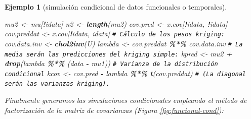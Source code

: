 \documentclass[
  spanish,
  10pt,
]{book}
\newenvironment{Shaded}{\begin{snugshade}}{\end{snugshade}}
\newcommand{\CommentTok}[1]{\textcolor[rgb]{0.56,0.35,0.01}{\textit{#1}}}
\newcommand{\FunctionTok}[1]{\textcolor[rgb]{0.13,0.29,0.53}{\textbf{#1}}}
\newcommand{\NormalTok}[1]{#1}
\newcommand{\OtherTok}[1]{\textcolor[rgb]{0.56,0.35,0.01}{#1}}
\newcommand{\SpecialCharTok}[1]{\textcolor[rgb]{0.81,0.36,0.00}{\textbf{#1}}}
\theoremstyle{break}
\newtheorem{example}{Ejemplo}[chapter]
\theoremstyle{nonumberplain}
\renewcommand{\CommentTok}[1]{\textcolor[rgb]{0.41,0.41,0.41}{\texttt{#1}}}
\begin{document}
\begin{example}[simulación condicional de datos funcionales o temporales]
\begin{Shaded}
\begin{Highlighting}[]
\NormalTok{mu2 }\OtherTok{\textless{}{-}}\NormalTok{ mu[}\SpecialCharTok{!}\NormalTok{idata]}
\NormalTok{n2 }\OtherTok{\textless{}{-}} \FunctionTok{length}\NormalTok{(mu2)}
\NormalTok{cov.pred }\OtherTok{\textless{}{-}}\NormalTok{ x.cov[}\SpecialCharTok{!}\NormalTok{idata, }\SpecialCharTok{!}\NormalTok{idata]}
\NormalTok{cov.preddat }\OtherTok{\textless{}{-}}\NormalTok{ x.cov[}\SpecialCharTok{!}\NormalTok{idata, idata]}
\CommentTok{\# Cálculo de los pesos kriging:}
\NormalTok{cov.data.inv }\OtherTok{\textless{}{-}} \FunctionTok{chol2inv}\NormalTok{(U)}
\NormalTok{lambda }\OtherTok{\textless{}{-}}\NormalTok{ cov.preddat }\SpecialCharTok{\%*\%}\NormalTok{ cov.data.inv}
\CommentTok{\# La media serán las predicciones del kriging simple:}
\NormalTok{kpred }\OtherTok{\textless{}{-}}\NormalTok{ mu2 }\SpecialCharTok{+} \FunctionTok{drop}\NormalTok{(lambda }\SpecialCharTok{\%*\%}\NormalTok{ (data }\SpecialCharTok{{-}}\NormalTok{ mu1))}
\CommentTok{\# Varianza de la distribución condicional}
\NormalTok{kcov }\OtherTok{\textless{}{-}}\NormalTok{ cov.pred }\SpecialCharTok{{-}}\NormalTok{  lambda }\SpecialCharTok{\%*\%} \FunctionTok{t}\NormalTok{(cov.preddat)}
\CommentTok{\# (La diagonal serán las varianzas kriging). }
\end{Highlighting}
\end{Shaded}

Finalmente generamos las simulaciones condicionales empleando el método de factorización de la matriz de covarianzas (Figura \ref{fig:funcional-cond}):




\end{example}
\end{document}
